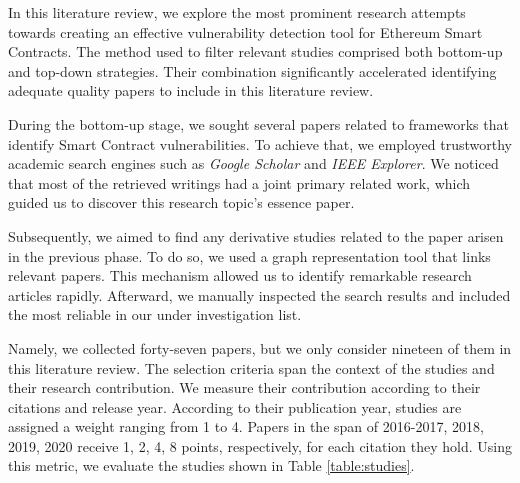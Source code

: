 \documentclass[a4paper,11pt]{article}
\begin{document}
In this literature review, we explore the most prominent research attempts
towards creating an effective vulnerability detection tool for Ethereum Smart
Contracts. The method used to filter relevant studies comprised both bottom-up
and top-down strategies. Their combination significantly accelerated identifying
adequate quality papers to include in this literature review.

During the bottom-up stage, we sought several papers related to frameworks that
identify Smart Contract vulnerabilities. To achieve that, we employed
trustworthy academic search engines such as \emph{Google Scholar} and \emph{IEEE
Explorer}. We noticed that most of the retrieved writings had a joint primary
related work, which guided us to discover this research topic's essence
paper\cite{luu2016making}. 

Subsequently, we aimed to find any derivative studies related to the paper
arisen in the previous phase. To do so, we used a graph representation
tool\cite{connectedpapers} that links relevant papers. This mechanism allowed us
to identify remarkable research articles rapidly. Afterward, we manually
inspected the search results and included the most reliable in our under
investigation list.

Namely, we collected forty-seven papers, but we only consider nineteen of them
in this literature review. The selection criteria span the context of the
studies and their research contribution. We measure their contribution according
to their citations and release year. According to their publication year,
studies are assigned a weight ranging from 1 to 4. Papers in the span of
2016-2017, 2018, 2019, 2020  receive 1, 2, 4, 8 points, respectively, for each
citation they hold. Using this metric, we evaluate the studies shown in Table
\ref{table:studies}.
\end{document}
